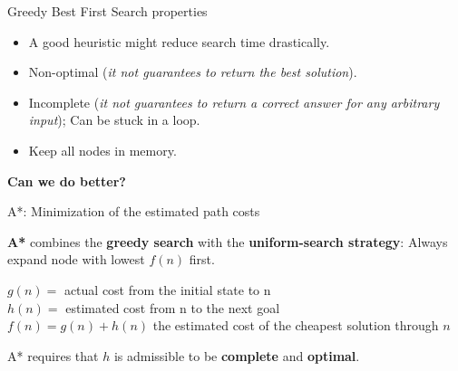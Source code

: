 \documentclass[9pt]{beamer}
\begin{document}
\begin{frame}{Greedy Best First Search properties}
\begin{small}
\begin{itemize}
    \item A good heuristic might reduce search time drastically.
    \item Non-optimal (\emph{it not guarantees to return the best solution}).
    \item Incomplete (\emph{it not guarantees to return a correct answer for any arbitrary input}); Can be stuck in a loop.
    \item Keep all nodes in memory.
\end{itemize}

\begin{center}
    \textbf{Can we do better?}
\end{center}

\end{small}
\end{frame}

\begin{frame}{A*: Minimization of the estimated path costs}
\begin{small}
\textbf{A*} combines the \textbf{greedy search} with the \textbf{uniform-search strategy}: Always expand node with lowest $f(n)$ first. \\

\vspace{2mm}

\hskip20pt $g(n) = $ actual cost from the initial state to n\\
\hskip20pt $h(n) = $ estimated cost from n to the next goal\\
\hskip20pt $f(n) = g(n) + h(n)$ the estimated cost of the cheapest solution through $n$\\

\vspace{2mm}

A* requires that $h$ is admissible to be \textbf{complete} and \textbf{optimal}.
\end{small}
\end{frame}
\end{document}
